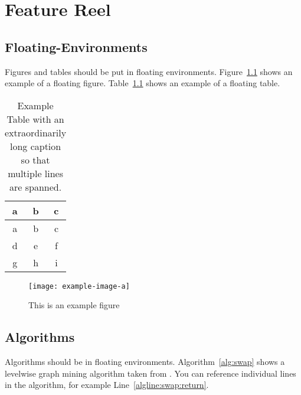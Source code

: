 \chapter{Feature Reel} 

\section{Floating-Environments} 

Figures and tables should be put in floating environments.
Figure~\ref{fig:example-fig} shows an example of a floating figure.
Table~\ref{tab:example-table} shows an example of a floating table.

\begin{table}[ht]
	\centering
	\begin{tabular}{ccc}
		\toprule
		a & b & c \\
		\midrule
		a & b & c \\
		d & e & f \\
		g & h & i \\
		\bottomrule
	\end{tabular}
	\caption{Example Table with an extraordinarily long caption so that multiple lines are spanned. } 
	\label{tab:example-table} 
\end{table}

\begin{figure}[ht]
	\centering 
	\texttt{[image: example-image-a]}
	\caption{This is an example figure} 
	\label{fig:example-fig} 
\end{figure}

\section{Algorithms} 
% 
Algorithms should be in floating environments. 
Algorithm~\ref{alg:swap} shows a levelwise graph mining algorithm taken from \cite{theoremofbenda}.
You can reference individual lines in the algorithm, for example Line~\ref{algline:swap:return}.

